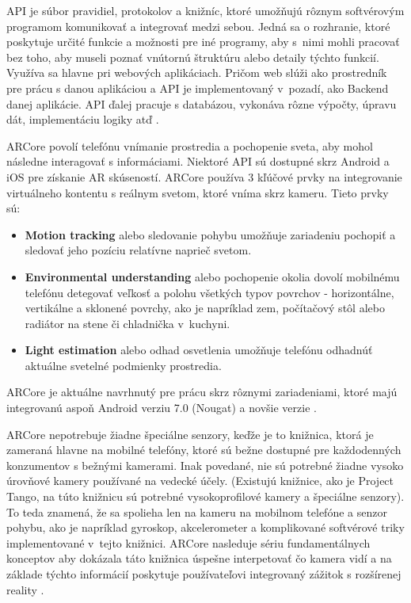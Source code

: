 API je súbor pravidiel, protokolov a knižníc, ktoré umožňujú rôznym softvérovým programom komunikovať a integrovať medzi sebou. Jedná sa o rozhranie, ktoré poskytuje určité funkcie a možnosti pre iné programy, aby s~nimi mohli pracovať bez toho, aby museli poznať vnútornú štruktúru alebo detaily týchto funkcií. Využíva sa hlavne pri webových aplikáciach. Pričom web slúži ako prostredník pre prácu s danou aplikáciou a API je implementovaný v~pozadí, ako Backend danej aplikácie. API ďalej pracuje s databázou, vykonáva rôzne výpočty, úpravu dát, implementáciu logiky atď \cite{kodouskova2020api}. 

ARCore povolí telefónu vnímanie prostredia a pochopenie sveta, aby mohol následne interagovať s informáciami. Niektoré API sú dostupné skrz Android a iOS pre získanie AR skúseností. ARCore používa 3 kľúčové prvky na integrovanie virtuálneho kontentu s reálnym svetom, ktoré vníma skrz kameru. Tieto prvky sú:

\begin{itemize}
    \item \textbf{Motion tracking} alebo sledovanie pohybu umožňuje zariadeniu pochopiť a sledovať jeho pozíciu relatívne naprieč svetom.
    
    \item \textbf{Environmental understanding} alebo pochopenie okolia dovolí mobilnému telefónu detegovať veľkosť a polohu všetkých typov povrchov - horizontálne, vertikálne a sklonené povrchy, ako je napríklad zem, počítačový stôl alebo radiátor na stene či chladnička v~kuchyni.
    
    \item \textbf{Light estimation} alebo odhad osvetlenia umožňuje telefónu odhadnúť aktuálne svetelné podmienky prostredia.
\end{itemize}


ARCore je aktuálne navrhnutý pre prácu skrz rôznymi zariadeniami, ktoré majú integrovanú aspoň Android verziu 7.0 (Nougat) a novšie verzie \cite{google2024arcore}. 

ARCore nepotrebuje žiadne špeciálne senzory, keďže je to knižnica, ktorá je zameraná hlavne na mobilné telefóny, ktoré sú bežne dostupné pre každodenných konzumentov s bežnými kamerami. Inak povedané, nie sú potrebné žiadne vysoko úrovňové kamery používané na vedecké účely. (Existujú knižnice, ako je Project Tango, na túto knižnicu sú potrebné vysokoprofilové kamery a špeciálne senzory). To teda znamená, že sa spolieha len na kameru na mobilnom telefóne a senzor pohybu, ako je napríklad gyroskop, akcelerometer a komplikované softvérové triky implementované v~tejto knižnici. ARCore nasleduje sériu fundamentálnych konceptov aby dokázala táto knižnica úspešne interpetovať čo kamera vidí a na základe týchto informácií poskytuje používateľovi integrovaný zážitok s rozšírenej reality \cite{conway2023arcore}. 

